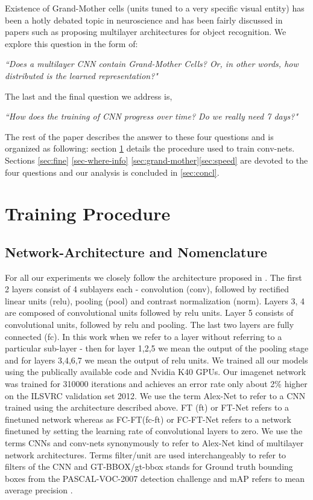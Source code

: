 \documentclass[runningheads]{llncs}
\begin{document}
Existence of Grand-Mother cells (units tuned to a very specific visual entity)  has been a hotly debated topic in neuroscience \cite{Grandmother} and has been fairly discussed in papers such as \cite{GoogleCat} proposing multilayer architectures for object recognition. We explore this question in the form of: 
\begin{center}
\textit{``Does a multilayer CNN contain Grand-Mother Cells? Or, in other words, how distributed is the learned representation?" }
\end{center}
The last and the final question we address is,
\begin{center}
\textit{``How does the training of CNN progress over time? Do we really need 7 days?"}
\end{center}

The rest of the paper describes the answer to these four questions and is organized as following: section \ref{sec:train} details the procedure used to train conv-nets.  Sections \ref{sec:fine} \ref{sec-where-info} \ref{sec:grand-mother}\ref{sec:speed} are devoted to the four questions and our analysis is concluded in \ref{sec:concl}.
\section{Training Procedure}
\label{sec:train}
\subsection{Network-Architecture and Nomenclature}
\label{sub:net-arch}
For all our experiments we closely follow the architecture proposed in \cite{Kriz}. The first 2 layers consist of 4 sublayers each - convolution (conv), followed by rectified linear units (relu), pooling (pool) and contrast normalization (norm). Layers 3, 4 are composed of convolutional units followed by relu units. Layer 5 consists of convolutional units, followed by relu and pooling. The last two layers are fully connected (fc). In this work when we refer to a layer without referring to a particular sub-layer - then for layer 1,2,5 we mean the output of the pooling stage and for layers 3,4,6,7 we mean the output of relu units. We trained all our models using the publically available code \cite{caffe} and Nvidia K40 GPUs. Our imagenet network was trained for 310000 iterations and achieves an error rate only about 2\% higher on the ILSVRC validation set 2012. \newline
We use the term Alex-Net to refer to a CNN trained using the architecture described above. FT (ft) or FT-Net refers to a finetuned network whereas as FC-FT(fc-ft) or FC-FT-Net refers to a network finetuned by setting the learning rate of convolutional layers to zero. We use the terms CNNs and conv-nets synonymously to refer to Alex-Net kind of multilayer network architectures. Terms filter/unit are used interchangeably to refer to filters of the CNN and GT-BBOX/gt-bbox stands for Ground truth bounding boxes from the PASCAL-VOC-2007 detection challenge and mAP refers to mean average precision \cite{Pascal}.
\end{document}
